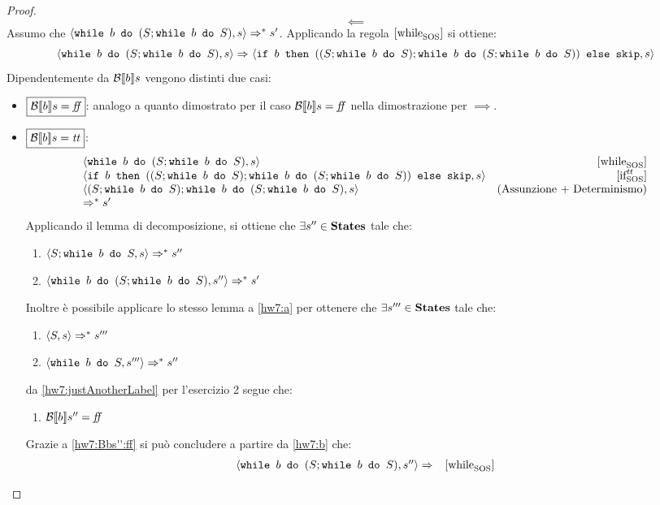 {\begin{proof}

$$
\boxed{\impliedby}
$$
Assumo che $\confSs{\wbS{b}{(S;\wbS{b}{S})}}{s} \Rar{*} s'$.
Applicando la regola $\whileSOS$ si ottiene:
$$\confSs{\wbS{b}{(S;\wbS{b}{S})}}{s}
	\Rar{ }
	\confSs{\ifABC{b}{((S; \wbS{b}{S});\wbS{b}{(S;\wbS{b}{S})})}{\skipForFriends}}{s}$$
Dipendentemente da $\B{b}$ vengono distinti due casi:
\begin{itemize}
	\item $\boxed{\B{b} = \semfalse}$: analogo a quanto dimostrato per il caso $\B{b} = \semfalse $ nella dimostrazione per $\boxed{\implies}$. 
	\item $\boxed{\B{b} = \semtrue}$:
	$$
	\begin{array}{lr}
	\confSs{\wbS{b}{(S; \wbS{b}{S})}}{s} & \whileSOS \\
	\confSs{\ifABC{b}{((S; \wbS{b}{S});\wbS{b}{(S;\wbS{b}{S})})}{\skipForFriends}}{s} & \ifttSOS \\
	\confSs{(S; \wbS{b}{S}); \wbS{b}{(S; \wbS{b}{S})}}{s} & \text{(Assunzione + Determinismo)}\\
	\Rar{*} s'
	\end{array}
	$$
	Applicando il lemma di decomposizione, si ottiene che $\exists s'' \in \states$ tale che:
	\begin{enumerate}[label=(\arabic*)]
		\item $\confSs{S; \wbS{b}{S}}{s} \Rar{*} s''$
		\label{hw7:a}
		\item $\confSs{\wbS{b}{(S; \wbS{b}{S}})}{s''} \Rar{*} s'$
		\label{hw7:b}
	\end{enumerate}
	Inoltre è possibile applicare lo stesso lemma a \ref{hw7:a} per ottenere che
	$\exists s''' \in \states$ tale che:
	\begin{enumerate}[label=(\Alph*)]
		\item $\confSs{S}{s} \Rar{*} s'''$
		\item $\confSs{\wbS{b}{S}}{s'''} \Rar{*}s''$
		\label{hw7:justAnotherLabel}
	\end{enumerate}
	da \ref{hw7:justAnotherLabel} per l'esercizio 2 segue che:
	\begin{enumerate}[label=(\Roman*)]
		\item $\B{b}'' = \semfalse$
		\label{hw7:Bbs'':ff}
	\end{enumerate}
	Grazie a \ref{hw7:Bbs'':ff} si può concludere a partire da \ref{hw7:b} che:
	$$
	\begin{array}{ll}
		\confSs{\wbS{b}{(S; \wbS{b}{S})}}{s''} \Rar{ }& \whileSOS \\

\end{array}$$
\end{itemize}
\end{proof}}
